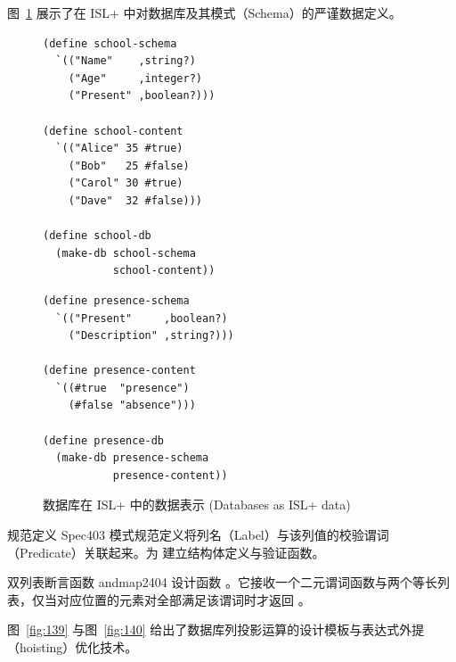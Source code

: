 图~\ref{fig:138} 展示了在 ISL+ 中对数据库及其模式（Schema）的严谨数据定义。

\begin{figure}[htbp]
  \centering
\begin{stepperbox}[unbreakable]
\noindent\begin{minipage}[t]{0.48\linewidth}\vspace{0pt}
\begin{Verbatim}[fontsize=\fontsize{6.0pt}{7.2pt}\selectfont]
(define school-schema
  `(("Name"    ,string?)
    ("Age"     ,integer?)
    ("Present" ,boolean?)))

(define school-content
  `(("Alice" 35 #true)
    ("Bob"   25 #false)
    ("Carol" 30 #true)
    ("Dave"  32 #false)))

(define school-db
  (make-db school-schema
           school-content))
\end{Verbatim}
\end{minipage}\hfill
\noindent\begin{minipage}[t]{0.48\linewidth}\vspace{0pt}
\begin{Verbatim}[fontsize=\fontsize{6.0pt}{7.2pt}\selectfont]
(define presence-schema
  `(("Present"     ,boolean?)
    ("Description" ,string?)))

(define presence-content
  `((#true  "presence")
    (#false "absence")))

(define presence-db
  (make-db presence-schema
           presence-content))
\end{Verbatim}
\end{minipage}
\end{stepperbox}
  \caption{数据库在 ISL+ 中的数据表示 (Databases as ISL+ data)}
  \label{fig:138}
\end{figure}

\begin{exercise}{规范定义 Spec}{403}
模式规范定义将列名（Label）与该列值的校验谓词（Predicate）关联起来。为  建立结构体定义与验证函数。
\end{exercise}

\begin{exercise}{双列表断言函数 andmap2}{404}
设计函数 。它接收一个二元谓词函数与两个等长列表，仅当对应位置的元素对全部满足该谓词时才返回 。
\end{exercise}

图~\ref{fig:139} 与图~\ref{fig:140} 给出了数据库列投影运算的设计模板与表达式外提（hoisting）优化技术。

